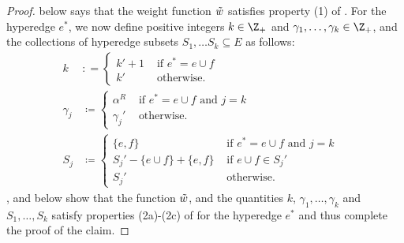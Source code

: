 \begin{proof}
     below says that the weight function $\Tilde{w}$ satisfies property (1) of . For the hyperedge $e^*$, we now define positive integers $k \in \Z_+$ and $\gamma_1, \ldots, \gamma_{k} \in \Z_+$, and the collections of hyperedge subsets $S_1, \ldots S_{k} \subseteq E$ as follows:
    \begin{align*}
        k &: =\begin{cases}
            k' + 1& \text{ if } e^* = e\cup f\\
            k'&\text{ otherwise.}
        \end{cases}&\\
        \gamma_j&\coloneqq  \begin{cases}
            \alpha^R& \text{ if } e^* = e\cup f \text{ and } j = k\\
            \gamma_j'&\text{ otherwise}.
        \end{cases}&\\
        S_j& \coloneqq  \begin{cases}
            \{e, f\}&\text{ if } e^* = e\cup f \text{ and } j = k\\
            S_j' - \{e\cup f\} + \{e, f\}&\text{ if } e\cup f \in S_j'\\
            S_j'& \text{ otherwise.}
        \end{cases}&
    \end{align*}
    ,  and  below show that the function $\Tilde{w}$, and the quantities $k$, $\gamma_1, \ldots, \gamma_k$ and $S_1, \ldots, S_k$ satisfy properties (2a)-(2c) of  for the hyperedge $e^*$ and thus complete the proof of the claim. 
\end{proof}

